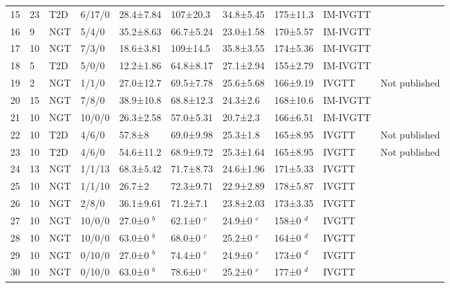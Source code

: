 \documentclass[utf8]{frontiersSCNS} %
\begin{document}
\begin{table}[h]
{\begin{tabular}{llllllllll}
15 & 23 & T2D & 6/17/0  & 28.4±7.84   & 107±20.3  & 34.8±5.45   & 175±11.3   & IM-IVGTT & \citet{2005_YoungT2_Nolan}       \\
16 & 9  & NGT & 5/4/0   & 35.2±8.63   & 66.7±5.24 & 23.0±1.58     & 170±5.57   & IM-IVGTT & \citet{2005_YoungT2_Nolan}       \\
17 & 10 & NGT & 7/3/0   & 18.6±3.81   & 109±14.5  & 35.8±3.55   & 174±5.36   & IM-IVGTT & \citet{2005_YoungT2_Nolan}       \\
18 & 5  & T2D & 5/0/0   & 12.2±1.86   & 64.8±8.17 & 27.1±2.94   & 155±2.79   & IM-IVGTT & \citet{2005_YoungT2_Nolan}      \\
19 & 2  & NGT & 1/1/0   & 27.0±12.7     & 69.5±7.78 & 25.6±5.68   & 166±9.19   & IVGTT   & Not published  \\
20 & 15 & NGT & 7/8/0   & 38.9±10.8   & 68.8±12.3 & 24.3±2.6    & 168±10.6   & IM-IVGTT & \citet{1998_InsSens_Pacini}      \\
21 & 10 & NGT & 10/0/0  & 26.3±2.58   & 57.0±5.31   & 20.7±2.3    & 166±6.51   & IM-IVGTT & \citet{2005_PCOS_Gennarelli}     \\
22 & 10 & T2D & 4/6/0   & 57.8±8      & 69.0±9.98   & 25.3±1.8    & 165±8.95   & IVGTT     & Not published  \\
23 & 10 & T2D & 4/6/0   & 54.6±11.2   & 68.9±9.72 & 25.3±1.64   & 165±8.95   & IVGTT    & Not published  \\
24 & 13 & NGT & 1/1/13  & 68.3±5.42   & 71.7±8.73 & 24.6±1.96   & 171±5.33   & IVGTT     & \citet{pacini_1998}                      \\
25 & 10 & NGT & 1/1/10  & 26.7±2      & 72.3±9.71 & 22.9±2.89   & 178±5.87   & IVGTT    & \citet{pacini_1998}                      \\
26 & 10 & NGT & 2/8/0   & 36.1±9.61   & 71.2±7.1  & 23.8±2.03   & 173±3.35   & IVGTT    & \citet{nardi_1994}                      \\
27 & 10 & NGT & 10/0/0  & 27.0±0 $^b$      & 62.1±0 $^c$  & 24.9±0 $^c$    & 158±0 $^d$    & IVGTT    & \citet{1998_AGING_Ahren}         \\
28 & 10 & NGT & 10/0/0  & 63.0±0 $^b$      & 68.0±0 $^c$    & 25.2±0 $^c$    & 164±0 $^d$    & IVGTT    & \citet{1998_AGING_Ahren}         \\
29 & 10 & NGT & 0/10/0  & 27.0±0 $^b$      & 74.4±0 $^c$  & 24.9±0 $^c$    & 173±0 $^d$    & IVGTT    & \citet{1998_AGING_Ahren}        \\
30 & 10 & NGT & 0/10/0  & 63.0±0 $^b$      & 78.6±0 $^c$  & 25.2±0 $^c$    & 177±0 $^d$    & IVGTT    & \citet{1998_AGING_Ahren}         \\

\end{tabular}}
\end{table}
\end{document}
